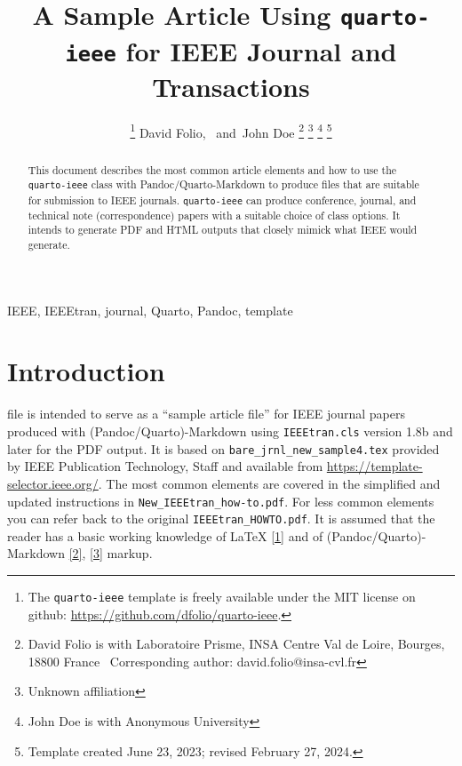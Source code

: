 \documentclass[
  journal,
]{IEEEtran}%
\title{A Sample Article Using \texttt{quarto-ieee} for IEEE Journal and
Transactions}
\author{
\thanks{The \texttt{quarto-ieee} template is freely available under the
MIT license on github: \url{https://github.com/dfolio/quarto-ieee}.}
David Folio\orcidlink{0000-0001-9430-6091},~\IEEEmembership{Member,
IEEE}
and~John Doe%
\thanks{David Folio is with Laboratoire Prisme, INSA Centre Val de
Loire, Bourges, 18800 France%
  Corresponding author: david.folio@insa-cvl.fr
}
\thanks{Unknown affiliation}
\thanks{John Doe is with Anonymous University%
}
\thanks{Template created June 23, 2023; revised February 27, 2024.}
}
\theoremstyle{plain}
\theoremstyle{remark}
\begin{document}


\maketitle

\begin{abstract}
This document describes the most common article elements and how to use
the \texttt{quarto-ieee} class with Pandoc/Quarto-Markdown to produce
files that are suitable for submission to IEEE journals.
\texttt{quarto-ieee} can produce conference, journal, and technical note
(correspondence) papers with a suitable choice of class options. It
intends to generate PDF and HTML outputs that closely mimick what IEEE
would generate.
\end{abstract}
\begin{IEEEkeywords}
IEEE, IEEEtran, journal, Quarto, Pandoc, template
\end{IEEEkeywords}

%

\ifdefined\Shaded\renewenvironment{Shaded}{\begin{tcolorbox}[borderline west={3pt}{0pt}{shadecolor}, boxrule=0pt, frame hidden, enhanced, interior hidden, sharp corners, breakable]}{\end{tcolorbox}}\fi

\hypertarget{sec-intro}{%
\section{Introduction}\label{sec-intro}}

 file is intended to serve as a ``sample article
file'' for IEEE journal papers produced with (Pandoc/Quarto)-Markdown
using \texttt{IEEEtran.cls} version 1.8b and later for the PDF output.
It is based on \texttt{bare\_jrnl\_new\_sample4.tex} provided by IEEE
Publication Technology, Staff and available from
\url{https://template-selector.ieee.org/}. The most common elements are
covered in the simplified and updated instructions in
\texttt{New\_IEEEtran\_how-to.pdf}. For less common elements you can
refer back to the original \texttt{IEEEtran\_HOWTO.pdf}. It is assumed
that the reader has a basic working knowledge of {\LaTeX}
\protect\hyperlink{ref-mittelbach2023latex}{{[}1{]}} and of
(Pandoc/Quarto)-Markdown
\protect\hyperlink{ref-MacFarlane_Pandoc}{{[}2{]}},
\protect\hyperlink{ref-Allaire_Quarto_2022}{{[}3{]}} markup.
\end{document}
